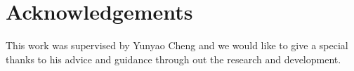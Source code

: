 \section*{Acknowledgements}
This work was supervised by Yunyao Cheng and we would like to give a special thanks to his advice and guidance through out the research and development.